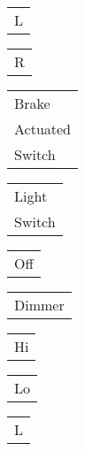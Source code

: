\documentclass{book}
\begin{document}
\stopmpxshipout
\mpxshipout%
{\small \renewcommand{\arraystretch}{.9}
                \circuitfont\begin{tabular}[t]{@{}r@{}}
                   L
	        \end{tabular}}%
\stopmpxshipout
\mpxshipout%
{\small \renewcommand{\arraystretch}{.9}
                \circuitfont\begin{tabular}[t]{@{}r@{}}
                   R
	        \end{tabular}}%
\stopmpxshipout
\mpxshipout%
{\small \renewcommand{\arraystretch}{.9}
                \circuitfont\begin{tabular}[b]{@{}l}
                   Brake \\ Actuated \\ Switch
	        \end{tabular}}%
\stopmpxshipout
\mpxshipout%
{\small \renewcommand{\arraystretch}{.9}
                \circuitfont\begin{tabular}[b]{@{}l@{}}
                   Light \\ Switch
	        \end{tabular}}%
\stopmpxshipout
\mpxshipout%
{\small \renewcommand{\arraystretch}{.9}
                \circuitfont\begin{tabular}{@{}r@{}}
                   Off
	        \end{tabular}}%
\stopmpxshipout
\mpxshipout%
{\small \renewcommand{\arraystretch}{.9}
                \circuitfont\begin{tabular}[b]{@{}l@{}}
                   Dimmer
	        \end{tabular}}%
\stopmpxshipout
\mpxshipout%
{\small \renewcommand{\arraystretch}{.9}
                \circuitfont\begin{tabular}{@{}l@{}}
                   Hi
	        \end{tabular}}%
\stopmpxshipout
\mpxshipout%
{\small \renewcommand{\arraystretch}{.9}
                \circuitfont\begin{tabular}{@{}r@{}}
                   Lo
	        \end{tabular}}%
\stopmpxshipout
\mpxshipout%
{\small \renewcommand{\arraystretch}{.9}
                \circuitfont\begin{tabular}[t]{@{}r@{}}
                   L
	        \end{tabular}}%
\stopmpxshipout
\end{document}
